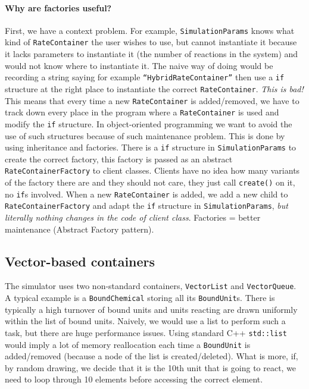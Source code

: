 \paragraph{Why are factories useful?} First, we have a context problem. For example, \texttt{SimulationParams} knows what kind of \texttt{RateContainer} the user wishes to use, but cannot instantiate it because it lacks parameters to instantiate it (the number of reactions in the system) and would not know where to instantiate it. The naive way of doing would be recording a string saying for example \texttt{``HybridRateContainer''} then use a \texttt{if} structure at the right place to instantiate the correct \texttt{RateContainer}. \emph{This is bad!} This means that every time a new \texttt{RateContainer} is added/removed, we have to track down every place in the program where a \texttt{RateContainer} is used and modify the \texttt{if} structure. In object-oriented programming we want to avoid the use of such structures because of such maintenance problem. This is done by using inheritance and factories. There is a \texttt{if} structure in \texttt{SimulationParams} to create the correct factory, this factory is passed as an abstract \texttt{RateContainerFactory} to client classes. Clients have no idea how many variants of the factory there are and they should not care, they just call \texttt{create()} on it, no \texttt{if}s involved. When a new \texttt{RateContainer} is added, we add a new child to \texttt{RateContainerFactory} and adapt the \texttt{if} structure in \texttt{SimulationParams}, \emph{but literally nothing changes in the code of client class}. Factories = better maintenance (Abstract Factory pattern).

\subsection{Vector-based containers}

The simulator uses two non-standard containers, \texttt{VectorList} and \texttt{VectorQueue}. A typical example is a \texttt{BoundChemical} storing all its \texttt{BoundUnit}s. There is typically a high turnover of bound units and units reacting are drawn uniformly within the list of bound units. Naively, we would use a list to perform such a task, but there are huge performance issues. Using standard C++ \texttt{std::list} would imply a lot of memory reallocation each time a \texttt{BoundUnit} is added/removed (because a node of the list is created/deleted). What is more, if, by random drawing, we decide that it is the 10th unit that is going to react, we need to loop through 10 elements before accessing the correct element.

